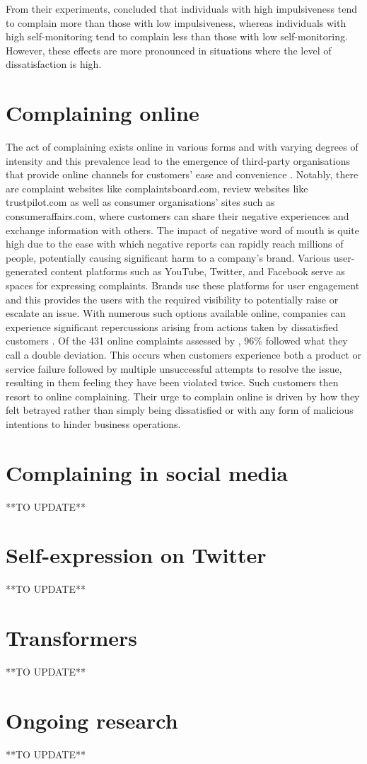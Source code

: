 From their experiments, \cite{sharma_complainers_2010} concluded that individuals with high impulsiveness tend to complain more than those with low impulsiveness, whereas individuals with high self-monitoring tend to complain less than those with low self-monitoring. However, these effects are more pronounced in situations where the level of dissatisfaction is high. 


\section{Complaining online}
The act of complaining exists online in various forms and with varying degrees of intensity and this prevalence lead to the emergence of third-party organisations that provide online channels for customers' ease and convenience \cite{tripp_when_2011}. Notably, there are complaint websites like complaintsboard.com, review websites like trustpilot.com as well as consumer organisations' sites such as consumeraffairs.com, where customers can share their negative experiences and exchange information with others. The impact of negative word of mouth is quite high due to the ease with which negative reports can rapidly reach millions of people, potentially causing significant harm to a company's brand. Various user-generated content platforms such as YouTube, Twitter, and Facebook serve as spaces for expressing complaints. Brands use these platforms for user engagement and this provides the users with the required visibility to potentially raise or escalate an issue. With numerous such options available online, companies can experience significant repercussions arising from actions taken by dissatisfied customers \cite{tripp_when_2011}.
\newline \newline
Of the 431 online complaints assessed by \cite{tripp_when_2011}, 96\% followed what they call a double deviation. This occurs when customers experience both a product or service failure followed by multiple unsuccessful attempts to resolve the issue, resulting in them feeling they have been violated twice. Such customers then resort to online complaining. Their urge to complain online is driven by how they felt betrayed rather than simply being dissatisfied or with any form of malicious intentions to hinder business operations.

\section{Complaining in social media}
**TO UPDATE**

\section{Self-expression on Twitter}
**TO UPDATE**

\section{Transformers}
**TO UPDATE**

\section{Ongoing research}
**TO UPDATE**